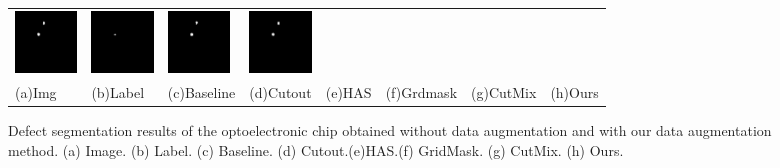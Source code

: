 \documentclass[sn-mathphys]{sn-jnl}%
\theoremstyle{thmstyleone}%
\theoremstyle{thmstyletwo}%
\theoremstyle{thmstylethree}%
\begin{document}
\begin{figure}
{\begin{tabular}{p{1.3cm}p{1.3cm}p{1.3cm}p{1.3cm}p{1.3cm}p{1.3cm}p{1.3cm}p{1.3cm}}
    \includegraphics[width=0.65in]{fig13-qipao28has.png}&
    \includegraphics[width=0.65in]{fig13-qipao28gridmask.png}&
    \includegraphics[width=0.65in]{fig13-qipao28cutmix.png}&
    \includegraphics[width=0.65in]{fig13-qipao28ours.png}\\

\centering\rmfamily\scriptsize (a)Img& \centering\rmfamily\scriptsize(b)Label& \centering\rmfamily\scriptsize(c)Baseline& \centering\rmfamily\scriptsize(d)Cutout& \centering\rmfamily\scriptsize(e)HAS& \centering\rmfamily\scriptsize(f)Grdmask& \centering\rmfamily\scriptsize(g)CutMix& \centering\rmfamily\scriptsize(h)Ours\\
\end{tabular}}
	\centering
	\caption{Defect segmentation results of the optoelectronic chip obtained without data augmentation and with our data augmentation method. (a) Image. (b) Label. (c) Baseline. (d) Cutout.(e)HAS.(f) GridMask. (g) CutMix. (h) Ours.}
	\label{fig:4.light222}
\end{figure}
\end{document}
